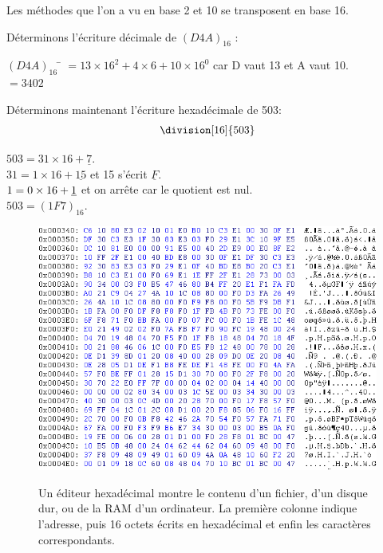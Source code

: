 Les méthodes que l'on a vu en base 2 et 10 se transposent en base 16.
\begin{methode}
    Déterminons l'écriture décimale de $(D4A)_{16}$ :
    \begin{tabbing}
        $(D4A)_{16}$  	\= $=13\times 16^2 + 4\times 6 + 10\times 16^0$	 car D vaut 13 et A vaut 10.\\
        \>	$=3402$
    \end{tabbing}
\end{methode}
\begin{methode}
    Déterminons maintenant l'écriture hexadécimale de 503:
    $$\division[16]{503}$$
    
    $503 = 31 \times 16 + \underline{7}$.\\
    
    $31 = 1\times 16 + \underline{15}$ et 15 s'écrit $\underline{F}$.\\
    
    $1 = {\boldmath 0}\times 16 + \underline{1}$ et on arrête car le quotient est nul.\\
    
    $503=(1F7)_{16}$.\\
    
\end{methode}
\begin{figure}[H]
    \begin{center}
        \includegraphics[width=12cm]{bases/img/hex.png}\\
        \caption*{Un éditeur hexadécimal montre le contenu d'un fichier, d'un disque dur, ou de la RAM d'un ordinateur. La première colonne indique l'adresse,
            puis 16 octets écrits en hexadécimal et enfin les caractères correspondants.}
    \end{center}
\end{figure}
